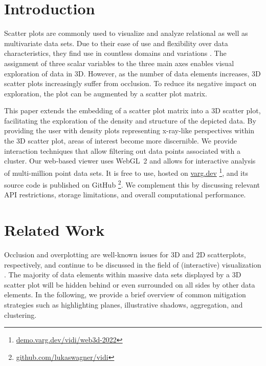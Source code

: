 \documentclass[sigconf]{acmart}
\begin{document}
\maketitle

\section{Introduction}
\label{sec:intro}
Scatter plots are commonly used to visualize and analyze relational as well as multivariate data sets.
Due to their ease of use and flexibility over data characteristics, they find use in countless domains and variations \cite{scatterplotSurvey,spDimRedChoices}.
The assignment of three scalar variables to the three main axes enables visual exploration of data in 3D.
However, as the number of data elements increases, 3D scatter plots increasingly suffer from occlusion.
To reduce its negative impact on exploration, the plot can be augmented by a scatter plot matrix.  

This paper extends the embedding of a scatter plot matrix into a 3D scatter plot, facilitating the exploration of the density and structure of the depicted data.
By providing the user with density plots representing x-ray-like perspectives within the 3D scatter plot, areas of interest become more discernible.
We provide interaction techniques that allow filtering out data points associated with a cluster.
Our web-based viewer uses WebGL~2 and allows for interactive analysis of multi-million point data sets.
It is free to use, hosted on
\href{https://varg.dev}{varg.dev}%
\footnote{\href{https://demo.varg.dev/vidi/web3d-2022}{demo.varg.dev/vidi/web3d-2022}}, 
and its source code is published on GitHub%
\footnote{\href{https://github.com/lukaswagner/vidi}{github.com/lukaswagner/vidi}}.
We complement this by discussing relevant API restrictions, storage limitations, and overall computational performance.

\section{Related Work}
Occlusion and overplotting are well-known issues for 3D and 2D scatterplots, respectively, and continue to be discussed in the field of (interactive) visualization \cite{occlusionTaxonomy}.
The majority of data elements within massive data sets displayed by a 3D scatter plot will be hidden behind or even surrounded on all sides by other data elements.
In the following, we provide a brief overview of common mitigation strategies such as highlighting planes, illustrative shadows, aggregation, and clustering.
\end{document}
